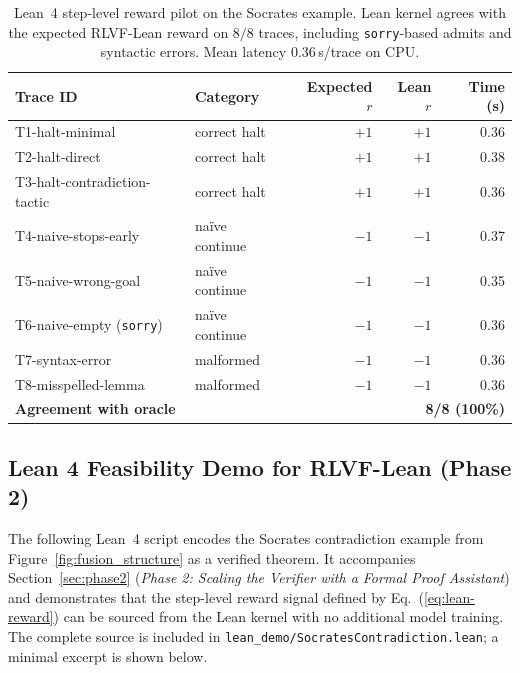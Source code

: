 \documentclass{article}
\begin{document}
\begin{table}[h]
\centering\small
\caption{Lean~4 step-level reward pilot on the Socrates example. Lean kernel agrees with the expected RLVF-Lean reward on $8/8$ traces, including \texttt{sorry}-based admits and syntactic errors. Mean latency $0.36$\,s/trace on CPU.}
\label{tab:lean_pilot}
\begin{tabular}{llrrr}
\toprule
\textbf{Trace ID} & \textbf{Category} & \textbf{Expected $r$} & \textbf{Lean $r$} & \textbf{Time (s)} \\
\midrule
T1-halt-minimal              & correct halt       & $+1$ & $+1$ & 0.36 \\
T2-halt-direct               & correct halt       & $+1$ & $+1$ & 0.38 \\
T3-halt-contradiction-tactic & correct halt       & $+1$ & $+1$ & 0.36 \\
T4-naive-stops-early         & na\"ive continue   & $-1$ & $-1$ & 0.37 \\
T5-naive-wrong-goal          & na\"ive continue   & $-1$ & $-1$ & 0.35 \\
T6-naive-empty (\texttt{sorry}) & na\"ive continue & $-1$ & $-1$ & 0.36 \\
T7-syntax-error              & malformed          & $-1$ & $-1$ & 0.36 \\
T8-misspelled-lemma          & malformed          & $-1$ & $-1$ & 0.36 \\
\midrule
\multicolumn{2}{l}{\textbf{Agreement with oracle}} & \multicolumn{3}{r}{\textbf{8/8 (100\%)}} \\
\bottomrule
\end{tabular}
\end{table}

\subsection{Lean 4 Feasibility Demo for RLVF-Lean (Phase 2)}
\label{app:lean-demo}

The following Lean~4 script encodes the Socrates contradiction example from
Figure~\ref{fig:fusion_structure} as a verified theorem. It accompanies
Section~\ref{sec:phase2} (\emph{Phase 2: Scaling the Verifier with a Formal
Proof Assistant}) and demonstrates that the step-level reward signal defined
by Eq.~(\ref{eq:lean-reward}) can be sourced from the Lean kernel with no
additional model training. The complete source is included in
\texttt{lean\_demo/SocratesContradiction.lean}; a minimal excerpt is shown
below.
\end{document}

